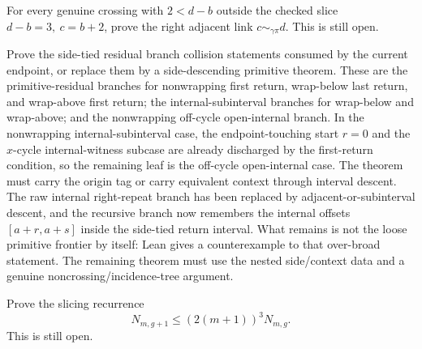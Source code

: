 \begin{theorem}
  \label{thm:open-large-gap-right}
  For every genuine crossing with \(2<d-b\) outside the checked slice
  \(d-b=3,\ c=b+2\), prove the right adjacent link
  \(c\sim_{\gamma\pi} d\).  This is still open.
\end{theorem}

\begin{theorem}
  \label{thm:open-minimal-frontier-collision}
  Prove the side-tied residual branch collision statements consumed by the
  current endpoint, or replace them by a side-descending primitive theorem.
  These are the primitive-residual branches for nonwrapping first return,
  wrap-below last return, and wrap-above first return; the internal-subinterval
  branches for wrap-below and wrap-above; and the nonwrapping off-cycle
  open-internal branch.  In the nonwrapping internal-subinterval case, the
  endpoint-touching start \(r=0\) and the \(x\)-cycle internal-witness subcase
  are already discharged by the first-return condition, so the remaining leaf
  is the off-cycle open-internal case.  The theorem must carry
  the origin tag or carry equivalent context through interval descent.  The raw
  internal right-repeat branch has been replaced by adjacent-or-subinterval
  descent, and the recursive branch now remembers the internal offsets
  \([a+r,a+s]\) inside the side-tied return interval.  What remains is not the
  loose primitive frontier by itself:
  Lean gives a counterexample to that over-broad statement.  The remaining
  theorem must use the nested side/context data and a genuine
  noncrossing/incidence-tree argument.
\end{theorem}

\begin{theorem}
  \label{thm:open-chapuy}
  Prove the slicing recurrence
  \[
    N_{m,g+1} \le (2(m+1))^3 N_{m,g}.
  \]
  This is still open.
\end{theorem}
